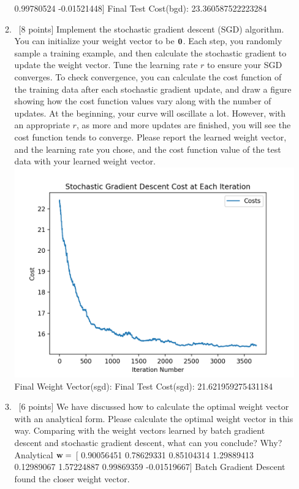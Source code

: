 \documentclass[12pt, fullpage,letterpaper]{article}
\begin{document}
\begin{enumerate}
\begin{enumerate}
		0.99780524 -0.01521448]\newline
		Final Test Cost(bgd):
		23.360587522223284
		\item~[8 points] Implement the stochastic gradient descent (SGD) algorithm. You can initialize your weight vector to be ${\bf 0}$. Each step, you randomly sample a training example, and then calculate the stochastic gradient to update the weight vector.  Tune the learning rate $r$ to ensure your SGD converges. To check convergence, you can calculate the cost function of the training data after each stochastic gradient update, and draw a figure showing how the cost function values vary along with the number of updates. At the beginning, your curve will oscillate a lot. However, with an appropriate $r$, as more and more updates are finished, you will see the cost function tends to converge. Please report the learned weight vector, and the learning rate you chose, and the cost function value of the test data with your learned weight vector.   
		\newline
		\includegraphics[scale=.8]{SGDCost.png}\newline
		Final Weight Vector(sgd):\newline
		[ 0.1330348  -0.0961236  -0.0408294   0.58685032 -0.0493948   0.42395254
		0.16574373  0.00766225]\newline
		Final Test Cost(sgd):
		21.621959275431184
		\item~[6 points] We have discussed how to  calculate the optimal weight vector with an analytical form. Please calculate the optimal weight vector in this way. Comparing with the  weight vectors learned by batch gradient descent and stochastic gradient descent, what can you conclude? Why?
		\newline
		Analytical ${\bf w} = $ [ 0.90056451  0.78629331  0.85104314  1.29889413  0.12989067  1.57224887
		0.99869359 -0.01519667] \newline
		Batch Gradient Descent found the closer weight vector.
	\end{enumerate}

\end{enumerate}
\end{document}
